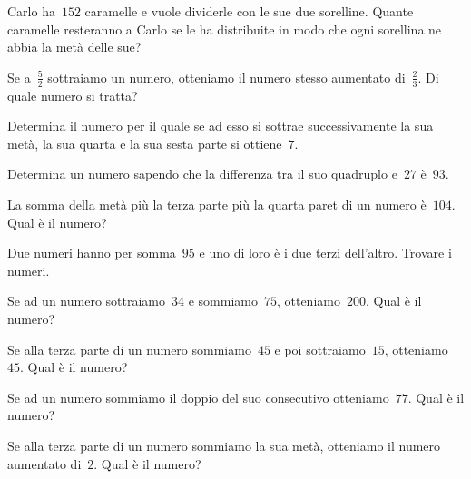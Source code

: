 \begin{multicols}{2}
\begin{esercizio}[\Ast]
\label{ese:16.10}
Carlo ha~$152$ caramelle e vuole dividerle con le sue due sorelline. Quante caramelle resteranno a Carlo se le ha distribuite in modo che ogni sorellina ne abbia la metà delle sue?
\end{esercizio}

\begin{esercizio}[\Ast]
\label{ese:16.11}
Se a~$\frac{5}{2}$ sottraiamo un numero, otteniamo il numero stesso aumentato di~$\frac{2}{3}$. Di quale numero si tratta?
\end{esercizio}

\begin{esercizio}[\Ast]
\label{ese:16.12}
Determina il numero per il quale se ad esso si sottrae successivamente la sua metà, la sua quarta e la sua sesta parte si  ottiene~$7$.
\end{esercizio}

\begin{esercizio}[\Ast]
\label{ese:16.13}
Determina un numero sapendo che la differenza tra il suo quadruplo e~$27$ è~$93$.
\end{esercizio}

\begin{esercizio}[\Ast]
\label{ese:16.14}
La somma della metà più la terza parte più la quarta paret di un numero è~$104$. Qual è il numero?
\end{esercizio}

\begin{esercizio}[\Ast]
\label{ese:16.15}
Due numeri hanno per somma~$95$ e uno di loro è i due terzi dell'altro. Trovare i numeri.
\end{esercizio}

\begin{esercizio}[\Ast]
\label{ese:16.16}
Se ad un numero sottraiamo~$34$ e sommiamo~$75$, otteniamo~$200$. Qual è il numero?
\end{esercizio}

\begin{esercizio}[\Ast]
\label{ese:16.17}
Se alla terza parte di un numero sommiamo~$45$ e poi sottraiamo~$15$, otteniamo~$45$. Qual è il numero?
\end{esercizio}

\begin{esercizio}[\Ast]
\label{ese:16.18}
Se ad un numero sommiamo il doppio del suo consecutivo otteniamo~$77$. Qual è il numero?
\end{esercizio}

\begin{esercizio}[\Ast]
\label{ese:16.19}
Se alla terza parte di un numero sommiamo la sua metà, otteniamo il numero aumentato di~$2$. Qual è il numero?
\end{esercizio}


\end{multicols}
